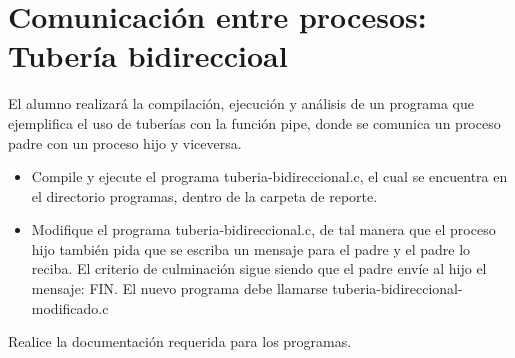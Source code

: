 \section{Comunicación entre procesos: Tubería bidireccioal}

	El alumno realizará la compilación, ejecución y análisis de un programa que ejemplifica el uso de tuberías con la función pipe, donde se comunica un proceso padre con un proceso hijo y viceversa.

\begin{itemize}

	\item Compile y ejecute el programa tuberia-bidireccional.c, el cual se encuentra en el directorio programas, dentro de la carpeta de reporte.

	\item Modifique el programa tuberia-bidireccional.c, de tal manera que el proceso hijo también pida que se escriba un mensaje para el padre y el padre lo reciba. El criterio de culminación sigue siendo que el padre envíe al hijo el mensaje: FIN. El nuevo programa debe llamarse tuberia-bidireccional-modificado.c

\end{itemize}

	Realice la documentación requerida para los programas.
	